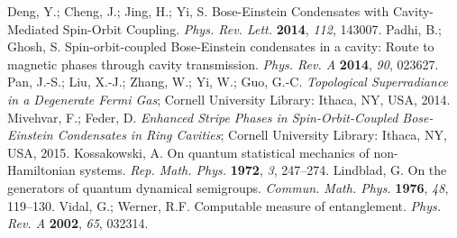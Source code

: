\documentclass[atoms,article,accept,moreauthors,pdftex,12pt,a4paper]{mdpi}
\begin{document}
\begin{thebibliography}{----}
Deng, Y.; Cheng, J.; Jing, H.; Yi, S. Bose-Einstein Condensates with Cavity-Mediated Spin-Orbit Coupling. {\em Phys. Rev. Lett.} {\bf 2014}, {\em 112}, 143007.
Padhi, B.; Ghosh, S. Spin-orbit-coupled Bose-Einstein condensates in a cavity: Route to magnetic phases through cavity transmission. {\em Phys. Rev. A} {\bf 2014}, {\em 90}, 023627.
Pan, J.-S.; Liu, X.-J.; Zhang, W.; Yi, W.; Guo, G.-C. \emph{Topological Superradiance in a Degenerate Fermi Gas}; Cornell University Library:  Ithaca, NY, USA,  2014.
Mivehvar, F.; Feder, D. \emph{Enhanced Stripe Phases in Spin-Orbit-Coupled Bose-Einstein Condensates in Ring Cavities}; Cornell University Library:  Ithaca, NY, USA,  2015.%
Kossakowski, A. On quantum statistical mechanics of non-Hamiltonian systems. \emph{{Rep. Math. Phys.}} {\bf 1972}, {\em 3}, 247--274.
Lindblad, G. On the generators of quantum dynamical semigroups. {\em Commun. Math. Phys.} {\bf 1976}, {\em 48}, 119--130.
Vidal, G.; Werner, R.F. Computable measure of entanglement. {\em Phys. Rev. A} {\bf 2002}, {\em 65}, 032314.
\end{thebibliography}
\end{document}
